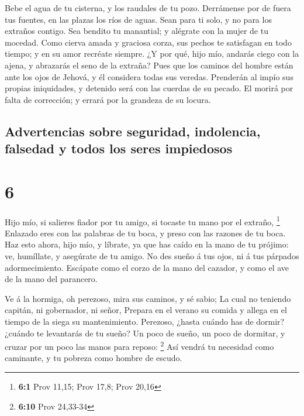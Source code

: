  Bebe el agua de tu cisterna, y los raudales de tu pozo.
 Derrámense por de fuera tus fuentes, en las plazas los
ríos de aguas.  Sean para ti solo, y no para los extraños
contigo.  Sea bendito tu manantial; y alégrate con la
mujer de tu mocedad.  Como cierva amada y graciosa corza,
sus pechos te satisfagan en todo tiempo; y en su amor recréate siempre.
 ¿Y por qué, hijo mío, andarás ciego con la ajena, y
abrazarás el seno de la extraña?  Pues que los caminos
del hombre están ante los ojos de Jehová, y él considera todas sus
veredas.  Prenderán al impío sus propias iniquidades, y
detenido será con las cuerdas de su pecado.  El morirá
por falta de corrección; y errará por la grandeza de su locura.

\hypertarget{advertencias-sobre-seguridad-indolencia-falsedad-y-todos-los-seres-impiedosos}{%
\subsection{Advertencias sobre seguridad, indolencia, falsedad y todos
los seres
impiedosos}\label{advertencias-sobre-seguridad-indolencia-falsedad-y-todos-los-seres-impiedosos}}

\hypertarget{section-5}{%
\section{6}\label{section-5}}

 Hijo mío, si salieres fiador por tu amigo, si tocaste tu
mano por el extraño, \footnote{\textbf{6:1} Prov 11,15; Prov 17,8; Prov
  20,16}  Enlazado eres con las palabras de tu boca, y
preso con las razones de tu boca.  Haz esto ahora, hijo
mío, y líbrate, ya que has caído en la mano de tu prójimo: ve,
humíllate, y asegúrate de tu amigo.  No des sueño á tus
ojos, ni á tus párpados adormecimiento.  Escápate como el
corzo de la mano del cazador, y como el ave de la mano del parancero.

 Ve á la hormiga, oh perezoso, mira sus caminos, y sé
sabio;  La cual no teniendo capitán, ni gobernador, ni
señor,  Prepara en el verano su comida y allega en el
tiempo de la siega su mantenimiento.  Perezoso, ¿hasta
cuándo has de dormir? ¿cuándo te levantarás de tu sueño? 
Un poco de sueño, un poco de dormitar, y cruzar por un poco las manos
para reposo: \footnote{\textbf{6:10} Prov 24,33-34}  Así
vendrá tu necesidad como caminante, y tu pobreza como hombre de escudo.

